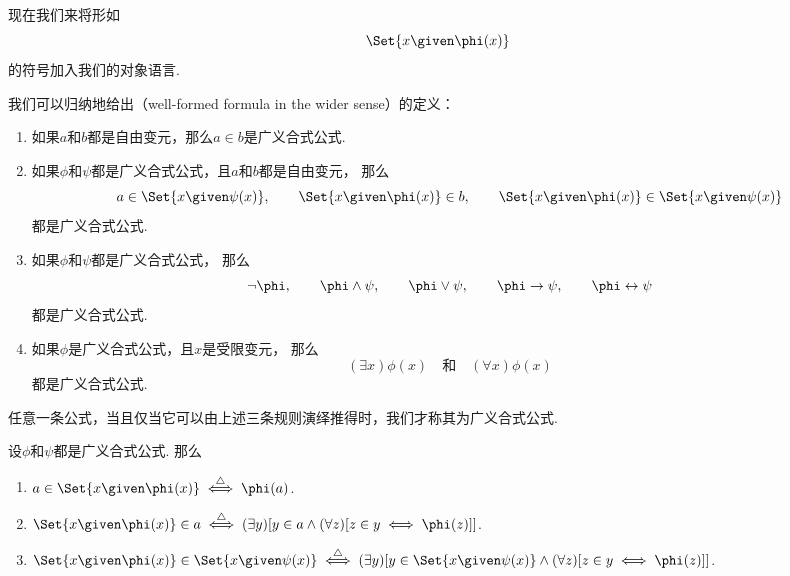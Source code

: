 现在我们来将形如\begin{equation*}
	\Set{ x \given \phi(x) }
\end{equation*}的符号加入我们的对象语言.
\begin{definition}
我们可以归纳地给出（well-formed formula in the wider sense）的定义：
\begin{enumerate}
	\item 如果\(a\)和\(b\)都是自由变元，那么\(a \in b\)是广义合式公式.

	\item 如果\(\phi\)和\(\psi\)都是广义合式公式，且\(a\)和\(b\)都是自由变元，
	那么\begin{equation*}
		\def\A{\Set{ x \given \psi(x) }}
		\def\B{\Set{ x \given \phi(x) }}
		a \in \A, \qquad
		\B \in b, \qquad
		\B \in \A
	\end{equation*}都是广义合式公式.

	\item 如果\(\phi\)和\(\psi\)都是广义合式公式，
	那么\begin{equation*}
		\neg\phi,
		\qquad
		\phi\land\psi,
		\qquad
		\phi\lor\psi,
		\qquad
		\phi\limp\psi,
		\qquad
		\phi\liff\psi
	\end{equation*}
	都是广义合式公式.

	\item 如果\(\phi\)是广义合式公式，且\(x\)是受限变元，
	那么\begin{equation*}
		(\exists x)\phi(x)
		\quad\text{和}\quad
		(\forall x)\phi(x)
	\end{equation*}都是广义合式公式.
\end{enumerate}
任意一条公式，当且仅当它可以由上述三条规则演绎推得时，我们才称其为广义合式公式.
\end{definition}

\begin{definition}
设\(\phi\)和\(\psi\)都是广义合式公式.
\def\A{\Set{ x \given \phi(x) }}
\def\B{\Set{ x \given \psi(x) }}
那么\begin{enumerate}
	\item \(a \in \A \defiff \phi(a)\).
	\item \(\A \in a \defiff (\exists y)[y \in a \land (\forall z)[z \in y \iff \phi(z)]]\).
	\item \(\A \in \B \defiff (\exists y)[y \in \B \land (\forall z)[z \in y \iff \phi(z)]]\).
\end{enumerate}
\end{definition}

